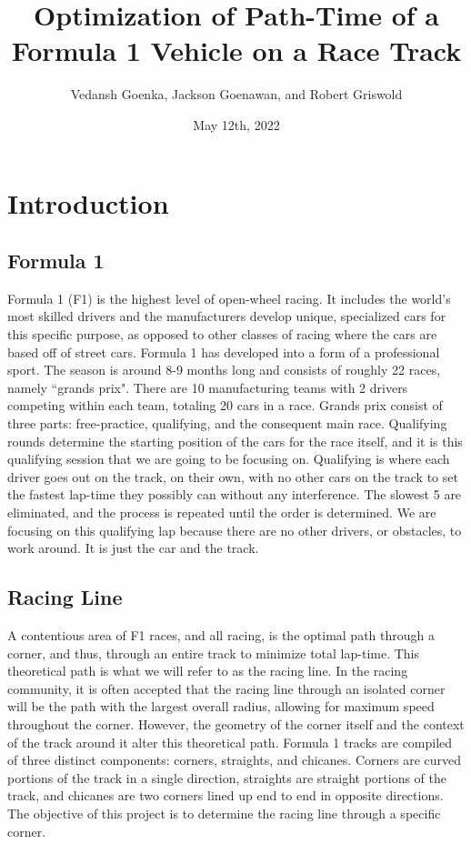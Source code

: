 \documentclass{article}
\title{Optimization of Path-Time of a Formula 1 Vehicle on a Race Track}
\author{Vedansh Goenka, Jackson Goenawan, and Robert Griswold}
\date{May 12th, 2022}
\begin{document}
\maketitle
\section{Introduction}
\subsection{Formula 1}

Formula 1 (F1) is the highest level of open-wheel racing. It includes the world's most skilled drivers and the manufacturers develop unique, specialized cars for this specific purpose, as opposed to other classes of racing where the cars are based off of street cars. Formula 1 has developed into a form of a professional sport. The season is around 8-9 months long and consists of roughly 22 races, namely “grands prix". There are 10 manufacturing teams with 2 drivers competing within each team, totaling 20 cars in a race. Grands prix consist of three parts: free-practice, qualifying, and the consequent main race. Qualifying rounds determine the starting position of the cars for the race itself, and it is this qualifying session that we are going to be focusing on. Qualifying is where each driver goes out on the track, on their own, with no other cars on the track to set the fastest lap-time they possibly can without any interference. The slowest 5 are eliminated, and the process is repeated until the order is determined. We are focusing on this qualifying lap because there are no other drivers, or obstacles, to work around. It is just the car and the track.

\subsection{Racing Line}

A contentious area of F1 races, and all racing, is the optimal path through a corner, and thus, through an entire track to minimize total lap-time. This theoretical path is what we will refer to as the racing line. In the racing community, it is often accepted that the racing line through an isolated corner will be the path with the largest overall radius, allowing for maximum speed throughout the corner. However, the geometry of the corner itself and the context of the track around it alter this theoretical path. Formula 1 tracks are compiled of three distinct components: corners, straights, and chicanes. Corners are curved portions of the track in a single direction, straights are straight portions of the track, and chicanes are two corners lined up end to end in opposite directions. The objective of this project is to determine the racing line through a specific corner.
\end{document}
